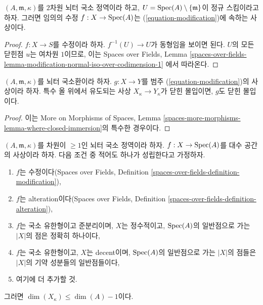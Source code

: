 \begin{lemma}
\label{lemma-modification}
$(A, \mathfrak m, \kappa)$를 $2$차원 뇌터 국소 정역이라 하고,
$U = \mathop{\mathrm{Spec}}(A) \setminus \{\mathfrak m\}$이 정규 스킴이라고 하자.
그러면 임의의 수정 $f : X \to \mathop{\mathrm{Spec}}(A)$는
(\ref{equation-modification})에 속하는 사상이다.
\end{lemma}

\begin{proof}
$f : X \to S$를 수정이라 하자. $f^{-1}(U) \to U$가 동형임을
보이면 된다. $U$의 모든 닫힌점 $u$는 여차원 $1$이므로, 이는
Spaces over Fields, Lemma
\ref{spaces-over-fields-lemma-modification-normal-iso-over-codimension-1}
에서 따라온다.
\end{proof}

\begin{lemma}
\label{lemma-closed-immersion-on-fibre}
$(A, \mathfrak m, \kappa)$를 뇌터 국소환이라 하자.
$g : X \to Y$를 범주 (\ref{equation-modification})의 사상이라 하자.
특수 올 위에서 유도되는 사상 $X_\kappa \to Y_\kappa$가 닫힌 몰입이면,
$g$도 닫힌 몰입이다.
\end{lemma}

\begin{proof}
이는 More on Morphisms of Spaces, Lemma
\ref{spaces-more-morphisms-lemma-where-closed-immersion}의 특수한 경우이다.
\end{proof}

\begin{lemma}
\label{lemma-dimension-special-fibre}
$(A, \mathfrak m, \kappa)$를 차원이 $\geq 1$인 뇌터 국소 정역이라 하자.
$f : X \to \mathop{\mathrm{Spec}}(A)$를 대수 공간의 사상이라 하자.
다음 조건 중 적어도 하나가 성립한다고 가정하자.
\begin{enumerate}
\item $f$는 수정이다(Spaces over Fields, Definition
\ref{spaces-over-fields-definition-modification}),
\item $f$는 alteration이다(Spaces over Fields, Definition
\ref{spaces-over-fields-definition-alteration}),
\item $f$는 국소 유한형이고 준분리이며, $X$는 정수적이고,
$\mathop{\mathrm{Spec}}(A)$의 일반점으로 가는 $|X|$의 점은 정확히 하나이다,
\item $f$는 국소 유한형이고, $X$는 decent이며, $\mathop{\mathrm{Spec}}(A)$의 일반점으로
가는 $|X|$의 점들은 $|X|$의 기약 성분들의 일반점들이다,
\item 여기에 더 추가할 것.
\end{enumerate}
그러면 $\dim(X_\kappa) \leq \dim(A) - 1$이다.
\end{lemma}


